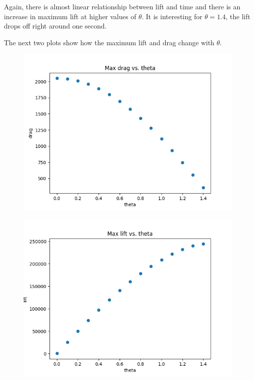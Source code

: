 \documentclass[12pt]{article}
\theoremstyle{definition}
\numberwithin{equation}{section}
\begin{document}
	Again, there is almost linear relationship between lift and time and there is an increase in maximum lift at higher values of $\theta$. It is interesting for $\theta = 1.4$, the lift drops off right around one second. 
	
	The next two plots show how the maximum lift and drag change with $\theta$.
	\begin{figure}[H]
		\centering
		\includegraphics[scale=0.4]{../maxdrag.png}
		\caption{}
	\end{figure}
	\begin{figure}[H]
		\centering
		\includegraphics[scale=0.4]{../maxlift.png}
		\caption{}
	\end{figure}
\end{document}
